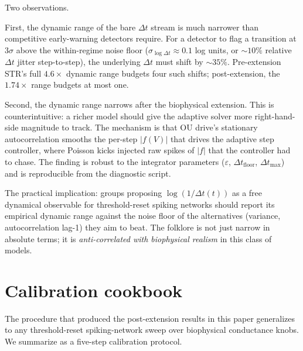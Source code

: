 \documentclass[11pt]{article}
\newcommand{\dt}{\Delta t}
\begin{document}
Two observations.

First, the dynamic range of the bare $\dt$ stream is much narrower
than competitive early-warning detectors require. For a detector to
flag a transition at $3\sigma$ above the within-regime noise floor
($\sigma_{\log\dt} \approx 0.1$ log units, or $\sim\!10\%$ relative
$\dt$ jitter step-to-step), the underlying $\dt$ must shift by
$\sim\!35\%$. Pre-extension STR's full $4.6\times$ dynamic range
budgets four such shifts; post-extension, the $1.74\times$ range
budgets at most one.

Second, the dynamic range narrows after the biophysical extension.
This is counterintuitive: a richer model should give the adaptive
solver more right-hand-side magnitude to track. The mechanism is that
OU drive's stationary autocorrelation smooths the per-step $|f(V)|$
that drives the adaptive step controller, where Poisson kicks
injected raw spikes of $|f|$ that the controller had to chase. The
finding is robust to the integrator parameters
($\varepsilon$, $\dt_{\text{floor}}$, $\dt_{\text{max}}$) and is
reproducible from the diagnostic script.

The practical implication: groups proposing $\log(1/\dt(t))$ as a
free dynamical observable for threshold-reset spiking networks
should report its empirical dynamic range against the noise floor of
the alternatives (variance, autocorrelation lag-1) they aim to
beat. The folklore is not just narrow in absolute terms; it is
\emph{anti-correlated with biophysical realism} in this class of
models.

\section{Calibration cookbook}
\label{sec:cookbook}

The procedure that produced the post-extension results in this paper
generalizes to any threshold-reset spiking-network sweep over
biophysical conductance knobs. We summarize as a five-step
calibration protocol.
\end{document}

